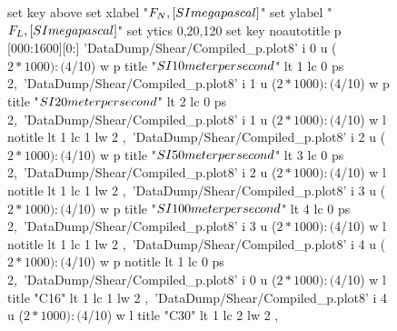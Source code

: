 \documentclass[5p]{elsarticle}
\begin{document}
\begin{figure}[htp]
    	\begin{center}
		\begin{gnuplot}[terminal=epslatex, terminaloptions={size \SERFigwidth cm, \SERFigheight cm color solid}]
			set key above
			set xlabel "$F_N \\, [\\SI{}{\\mega\\pascal}]$"
			set ylabel "$F_L \\, [\\SI{}{\\mega\\pascal}]$"
			set ytics 0,20,120
			set key noautotitle
            p [000:1600][0:]	'DataDump/Shear/Compiled_p.plot8' i 0 u ($2*1000):($4/10) w p title "$\\SI{10}{\\meter\\per\\second}$" lt 1 lc 0 ps 2,\
                'DataDump/Shear/Compiled_p.plot8' i 1 u ($2*1000):($4/10) w p title "$\\SI{20}{\\meter\\per\\second}$" lt 2 lc 0 ps 2,\
	    		'DataDump/Shear/Compiled_p.plot8' i 1 u ($2*1000):($4/10) w l notitle  lt 1 lc 1 lw 2	,\
                'DataDump/Shear/Compiled_p.plot8' i 2 u ($2*1000):($4/10) w p title "$\\SI{50}{\\meter\\per\\second}$" lt 3 lc 0 ps 2,\
	    		'DataDump/Shear/Compiled_p.plot8' i 2 u ($2*1000):($4/10) w l notitle  lt 1 lc 1 lw 2	,\
                'DataDump/Shear/Compiled_p.plot8' i 3 u ($2*1000):($4/10) w p title "$\\SI{100}{\\meter\\per\\second}$" lt 4 lc 0 ps 2,\
	    		'DataDump/Shear/Compiled_p.plot8' i 3 u ($2*1000):($4/10) w l notitle  lt 1 lc 1 lw 2 ,\
                'DataDump/Shear/Compiled_p.plot8' i 4 u ($2*1000):($4/10) w p notitle  lt 1 lc 0 ps 2,\
	    		'DataDump/Shear/Compiled_p.plot8' i 0 u ($2*1000):($4/10) w l title "C16" lt 1 lc 1 lw 2 ,\
	    		'DataDump/Shear/Compiled_p.plot8' i 4 u ($2*1000):($4/10) w l title "C30" lt 1 lc 2 lw 2 ,\	    		

\end{gnuplot}
\end{center}
\end{figure}
\end{document}
